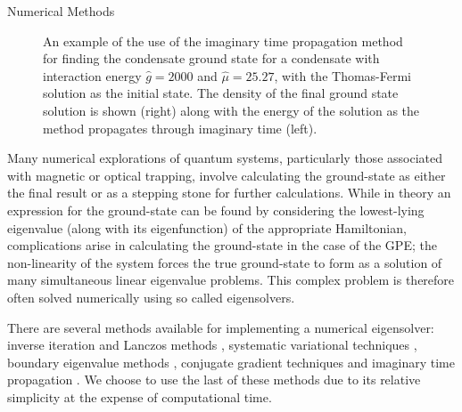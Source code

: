 \begin{chapter}{\label{cha:numerics}Numerical Methods}
\begin{figure}
	\caption{An example of the use of the imaginary time propagation method for finding the condensate ground state for a condensate with interaction energy $\hat{g}=2000$ and $\hat{\mu}=25.27$, with the Thomas-Fermi solution as the initial state. The density of the final ground state solution is shown (right) along with the energy of the solution as the method propagates through imaginary time (left).}\label{fig_imagtimesolgs}
\end{figure}
	Many numerical explorations of quantum systems, particularly those associated with magnetic or optical trapping,  involve calculating the ground-state as either the final result or as a stepping stone for further calculations. While in theory an expression for the ground-state can be found by considering the lowest-lying eigenvalue (along with its eigenfunction) of the appropriate Hamiltonian, complications arise in calculating the ground-state in the case of the GPE; the non-linearity of the system forces the true ground-state to form as a solution of many simultaneous linear eigenvalue problems.	This complex problem is therefore often solved numerically using so called eigensolvers.

	There are several methods available for implementing a numerical eigensolver: inverse iteration and Lanczos methods \cite{thijssen1999computational}, systematic variational techniques \cite{Bao2003230}, boundary eigenvalue methods \cite{Edwards95}, conjugate gradient techniques \cite{NumericalRecipes} and imaginary time propagation \cite{PhysRevE.62.7438}. We choose to use the last of these methods due to its relative simplicity at the expense of computational time.


\end{chapter}
